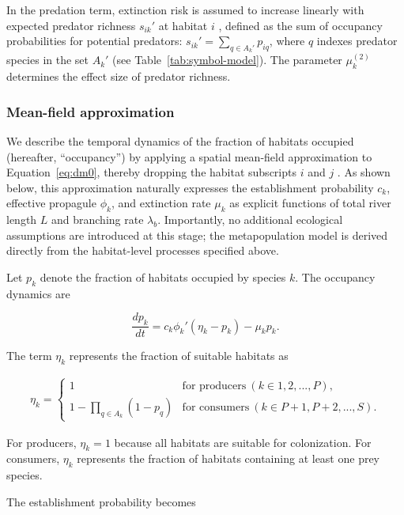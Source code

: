 \documentclass[11pt, class=article, crop=false]{standalone}
\theoremstyle{definition}
\begin{document}
In the predation term, extinction risk is assumed to increase linearly with expected predator richness $s_{ik}'$ at habitat $i$ \citep{shibasaki_food_2024, allan_stream_2007}, defined as the sum of occupancy probabilities for potential predators:
$s_{ik}'=\sum_{q \in A_k'}p_{iq}$,
where $q$ indexes predator species in the set $A_k'$ (see Table~\ref{tab:symbol-model}).
The parameter $\mu_k^{(2)}$ determines the effect size of predator richness.

\subsubsection{Mean-field approximation}
We describe the temporal dynamics of the fraction of habitats occupied (hereafter, ``occupancy'') by applying a spatial mean-field approximation to Equation~\ref{eq:dm0}, thereby dropping the habitat subscripts $i$ and $j$ \citep{ovaskainen_asymptotically_2006}.
As shown below, this approximation naturally expresses the establishment probability $c_k$, effective propagule $\phi_k$, and extinction rate $\mu_k$ as explicit functions of total river length $L$ and branching rate $\lambda_b$.
Importantly, no additional ecological assumptions are introduced at this stage; the metapopulation model is derived directly from the habitat-level processes specified above.

Let $p_k$ denote the fraction of habitats occupied by species $k$.
The occupancy dynamics are

\begin{equation}
    \frac{dp_k}{dt} = c_k \phi_k' (\eta_k - p_{k}) - \mu_{k} p_{k}.
\end{equation}

The term $\eta_k$ represents the fraction of suitable habitats as

\begin{align}
\eta_k =
    \begin{cases}
        1 &\text{for producers}~(k \in 1, 2,...,P),\\
        1 - \prod_{q \in A_k} (1 - p_q) &\text{for consumers}~(k \in P + 1, P + 2,...,S).
    \end{cases}
\end{align}

For producers, $\eta_k = 1$ because all habitats are suitable for colonization.
For consumers, $\eta_k$ represents the fraction of habitats containing at least one prey species.

The establishment probability becomes
\end{document}
